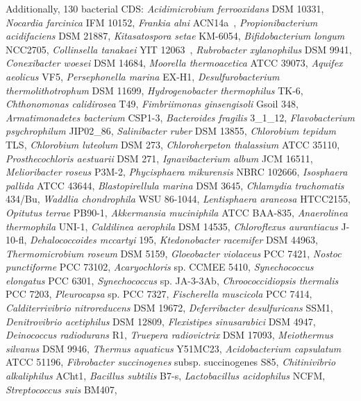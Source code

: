 Additionally, 130 bacterial CDS:
\textit{Acidimicrobium ferrooxidans} DSM 10331,
\textit{Nocardia farcinica} IFM 10152,
\textit{Frankia alni} ACN14a ,
\textit{Propionibacterium acidifaciens} DSM 21887,
\textit{Kitasatospora setae} KM-6054,
\textit{Bifidobacterium longum} NCC2705,
\textit{Collinsella tanakaei} YIT 12063 ,
\textit{Rubrobacter xylanophilus} DSM 9941,
\textit{Conexibacter woesei} DSM 14684,
\textit{Moorella thermoacetica} ATCC 39073,
\textit{Aquifex aeolicus} VF5,
\textit{Persephonella marina} EX-H1,
\textit{Desulfurobacterium thermolithotrophum} DSM 11699,
\textit{Hydrogenobacter thermophilus} TK-6,
\textit{Chthonomonas calidirosea} T49,
\textit{Fimbriimonas ginsengisoli} Gsoil 348,
\textit{Armatimonadetes bacterium} CSP1-3,
\textit{Bacteroides fragilis} 3_1_12,
\textit{Flavobacterium psychrophilum} JIP02_86,
\textit{Salinibacter ruber} DSM 13855,
\textit{Chlorobium tepidum} TLS,
\textit{Chlorobium luteolum} DSM 273,
\textit{Chloroherpeton thalassium} ATCC 35110,
\textit{Prosthecochloris aestuarii} DSM 271,
\textit{Ignavibacterium album} JCM 16511,
\textit{Melioribacter roseus} P3M-2,
\textit{Phycisphaera mikurensis} NBRC 102666,
\textit{Isosphaera pallida} ATCC 43644,
\textit{Blastopirellula marina} DSM 3645,
\textit{Chlamydia trachomatis} 434/Bu,
\textit{Waddlia chondrophila} WSU 86-1044,
\textit{Lentisphaera araneosa} HTCC2155,
\textit{Opitutus terrae} PB90-1,
\textit{Akkermansia muciniphila} ATCC BAA-835,
\textit{Anaerolinea thermophila} UNI-1,
\textit{Caldilinea aerophila} DSM 14535,
\textit{Chloroflexus aurantiacus} J-10-fl,
\textit{Dehalococcoides mccartyi} 195,
\textit{Ktedonobacter racemifer} DSM 44963,
\textit{Thermomicrobium roseum} DSM 5159,
\textit{Gloeobacter violaceus} PCC 7421,
\textit{Nostoc punctiforme} PCC 73102,
\textit{Acaryochloris} sp. CCMEE 5410,
\textit{Synechococcus elongatus} PCC 6301,
\textit{Synechococcus} sp. JA-3-3Ab,
\textit{Chroococcidiopsis thermalis} PCC 7203,
\textit{Pleurocapsa} sp. PCC 7327,
\textit{Fischerella muscicola} PCC 7414,
\textit{Calditerrivibrio nitroreducens} DSM 19672,
\textit{Deferribacter desulfuricans} SSM1,
\textit{Denitrovibrio acetiphilus} DSM 12809,
\textit{Flexistipes sinusarabici} DSM 4947,
\textit{Deinococcus radiodurans} R1,
\textit{Truepera radiovictrix} DSM 17093,
\textit{Meiothermus silvanus} DSM 9946,
\textit{Thermus aquaticus} Y51MC23,
\textit{Acidobacterium capsulatum} ATCC 51196,
\textit{Fibrobacter succinogenes} subsp. succinogenes S85,
\textit{Chitinivibrio alkaliphilus} ACht1,
\textit{Bacillus subtilis} B7-s,
\textit{Lactobacillus acidophilus} NCFM,
\textit{Streptococcus suis} BM407,
